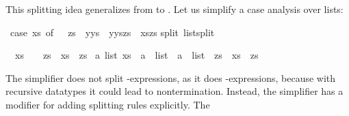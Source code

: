 \begin{isabellebody}
\begin{isamarkuptxt}
This splitting idea generalizes from  to .
Let us simplify a case analysis over lists:%
\end{isamarkuptxt}%
\isamarkuptrue%
%
\endisatagproof
{\isafoldproof}%
%
\isadelimproof
%
\endisadelimproof
{}\isamarkupfalse%
\ {}{}case\ xs\ of\ {}{}\ {}\ zs\ {}\ y{}ys\ {}\ y{}{}ys{}zs{}{}\ {}\ xs{}zs{}\isanewline
%
\isadelimproof
%
\endisadelimproof
%
\isatagproof
{}\isamarkupfalse%
{}split\ list{}split{}%
\begin{isamarkuptxt}%
\begin{isabelle}%
\ {}{}\ {}xs\ {}\ {}{}\ {}\ zs\ {}\ xs\ {}\ zs{}\ {}\isanewline
{}a\ list{}\ xs\ {}\ a\ {}\ list\ {}\ a\ {}\ list\ {}\ zs\ {}\ xs\ {}\ zs{}%
\end{isabelle}
The simplifier does not split
-expressions, as it does -expressions, 
because with recursive datatypes it could lead to nontermination.
Instead, the simplifier has a modifier
for adding splitting rules explicitly.  The

\end{isamarkuptxt}
\end{isabellebody}
